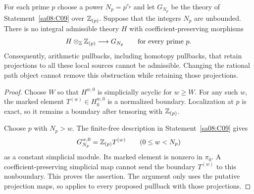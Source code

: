 \begin{proposition}\label{sa08:C12}
For each prime $p$ choose a power $N_p=p^{e_p}$ and let
$G_{N_p}$ be the theory of Statement~\ref{sa08:C09} over
$\mathbb Z_{(p)}$. Suppose that the integers $N_p$ are unbounded.
There is no integral admissible theory $H$ with coefficient-preserving
morphisms
\[
 H\otimes_{\mathbb Z}\mathbb Z_{(p)}\longrightarrow G_{N_p}
 \qquad\text{for every prime }p.
\]
Consequently, arithmetic pullbacks, including homotopy pullbacks,
that retain projections to all these local sources cannot be
admissible. Changing the rational path object cannot remove this
obstruction while retaining those projections.
\end{proposition}
\begin{proof}
Choose $W$ so that $H^{w,0}$ is simplicially acyclic for $w\ge W$.
For any such $w$, the marked element $T^{(w)}\in H_0^{w,0}$ is a
normalized boundary. Localization at $p$ is exact, so it remains a
boundary after tensoring with $\mathbb Z_{(p)}$.

Choose $p$ with $N_p>w$. The finite-free description in
Statement~\ref{sa08:C09} gives
\[
 G_{N_p}^{w,0}=\mathbb Z_{(p)}T^{(w)}
 \qquad(0\le w<N_p)
\]
as a constant simplicial module. Its marked element is nonzero in
$\pi_0$. A coefficient-preserving simplicial map cannot send the
boundary $T^{(w)}$ to this nonboundary. This proves the assertion.
The argument only uses the putative projection maps, so applies to
every proposed pullback with those projections.
\end{proof}
